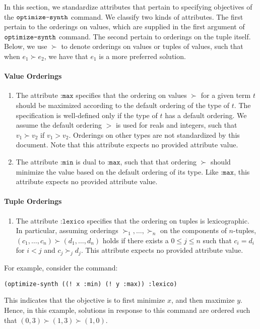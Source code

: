 \documentclass[english,a4paper,10pt]{article}
\begin{document}
In this section, we standardize attributes that pertain to specifying objectives of the $\texttt{optimize-synth}$ command.
We classify two kinds of attributes.
The first pertain to the orderings on values,
which are supplied in the first argument of $\texttt{optimize-synth}$ command.
The second pertain to orderings on the tuple itself.
Below, we use $\succ$ to denote orderings on values or tuples of values,
such that when $e_1 \succ e_2$, we have that $e_1$ is a more preferred solution.

\paragraph{Value Orderings}
\begin{enumerate}
\item The attribute $\texttt{:max}$ specifies that the ordering on values 
$\succ$ for a given term $t$ should be maximized according to the default ordering
of the type of $t$.
The specification is well-defined only if the type of $t$ has a default ordering.
We assume the default ordering $>$ is used for reals and integers, such that
$v_1 \succ v_2$ if $v_1 > v_2$.
Orderings on other types are not standardized by this document.
Note that this attribute expects no provided attribute value.
\item The attribute $\texttt{:min}$ is dual to $\texttt{:max}$, such that that ordering $\succ$
should minimize the value based on the default ordering of its type.
Like $\texttt{:max}$, this attribute expects no provided attribute value.
\end{enumerate}

\paragraph{Tuple Orderings}

\begin{enumerate}
\item The attribute $\texttt{:lexico}$ specifies that the ordering on tuples is lexicographic.
In particular, assuming orderings $\succ_1, \ldots, \succ_n$ on the components of $n$-tuples,
$(c_1, \ldots, c_n) \succ (d_1, \ldots, d_n)$ holds if there exists a $0 \leq j \leq n$
such that $c_i = d_i$ for $i<j$ and $c_j \succ_j d_j$.
This attribute expects no provided attribute value.
\end{enumerate}

\noindent
For example, consider the command:
\begin{lstlisting}[language=SyGuS, numbers=none, basicstyle=\ttfamily\small]
(optimize-synth ((! x :min) (! y :max)) :lexico)
\end{lstlisting}
This indicates that the objective is to first minimize $x$, and then maximize $y$.
Hence, in this example, solutions in response to this command are ordered such that
$(0,3) \succ (1,3) \succ (1,0)$.
\end{document}
